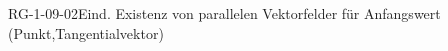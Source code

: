 
\begin{PROP}{RG-1-09-02}{Eind. Existenz von parallelen Vektorfelder für Anfangswert (Punkt,Tangentialvektor)}
\end{PROP}
